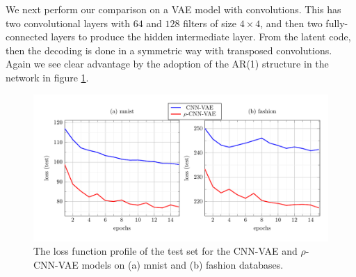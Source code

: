 \documentclass{article}
\begin{document}
%
%

We next perform our comparison on a VAE model with convolutions. This has two convolutional layers with $64$ and $128$ filters of size $4 \times 4 $, and then two fully-connected layers to produce the hidden intermediate layer. From the latent code, then the decoding is done in a symmetric way with transposed convolutions. Again we see clear advantage by the adoption of the AR(1) structure in the network in figure \ref{fig:curve_CNNVAE}.


 \begin{figure}  [!t]
   \begin{center} 
\includegraphics[width=1.0\textwidth]{figs/curves/CNN_VAE.pdf}
\end{center}
\vspace{-.75cm}   
   \caption{The loss function profile of the test set for the CNN-VAE and $\rho$-CNN-VAE models on (a) mnist and (b) fashion databases.}
   \label{fig:curve_CNNVAE}
   \end{figure}
\end{document}
